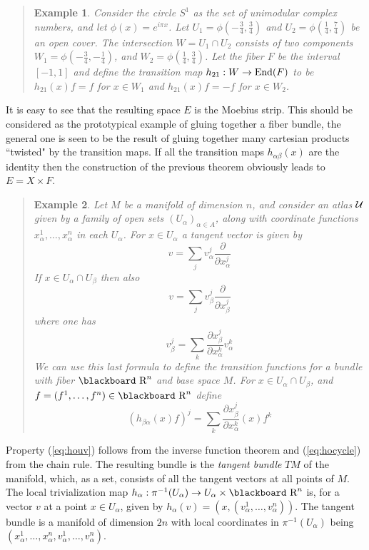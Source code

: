 \documentclass[12pt,titlepage]{article}
\def\bbf#1{\hbox{\blackboard #1}}
\def\lR{\bbf R}
\def\cU{{\cal U}}
\def\End{\hbox{End}}
\def\ppv#1#2{\frac{\partial}{\partial #1^#2}}
\newtheorem{eg}{Example}
\newenvironment{example}{\begin{quote}\begin{eg}}{\end{eg}\end{quote}}
\begin{document}
\begin{example}\label{ex:moebius}
Consider the circle \(S^1\) as the set of unimodular complex numbers,
and let \(\phi(x)=e^{i\pi x}\).
Let \(U_1=\phi(-\frac{3}{4},\frac{3}{4})\) 
and \(U_2=\phi(\frac{1}{4},\frac{7}{4})\) be an
open cover. The intersection \(W=U_1\cap U_2\) consists of two components
\(W_1=\phi(-\frac{3}{4},-\frac{1}{4})\), and 
\(W_2=\phi(\frac{1}{4},\frac{3}{4})\). Let the fiber
\(F\) be the interval \([-1,1]\) and define the transition map
\(h_{21}:W\to \End(F)\) to be \(h_{21}(x)f=f\) for \(x \in W_1\) and
\(h_{21}(x)f=-f\) for \(x \in W_2\). 
\end{example}%
It is easy to see that the resulting space
\(E\) is the Moebius strip. This should be considered as the
prototypical example of gluing together 
a fiber bundle, the general one is seen to be
the result of gluing together many cartesian products ``twisted" by the
transition maps. If all the transition maps \(h_{\alpha\beta}(x)\) are
the identity then the construction of the previous theorem obviously
leads to \(E=X\times F\). 
\begin{example}\label{ex:tm}
Let \(M\) be a manifold of dimension \(n\),
and consider an atlas \(\cU\) given by a family
of open sets
\((U_\alpha)_{\alpha\in A}\), along with coordinate functions
\(x_\alpha^1,\dots,x_\alpha^n\) in each \(U_\alpha\). For \(x\in
U_\alpha\) a tangent vector is given by
\[
v=\sum_jv_\alpha^j\frac{\partial}{\partial x_\alpha^j}
\]
If \(x\in U_\alpha\cap U_\beta\) then also 
\[
v=\sum_jv_\beta^j\ppv{x_\beta}{j}
\]
where one has
\[
v_\beta^j = \sum_k \frac{\partial x_\beta^j}{\partial x_\alpha^k}
v_\alpha^k
\]
We can use this last formula to define the transition functions for a
bundle with fiber \(\lR^n\) and base space \(M\). For \(x\in
U_\alpha\cap U_\beta\), and \(f=(f^1,\dots,f^n)\in\lR^n\) define
\[
(h_{\beta\alpha}(x)f)^j=
\sum_k \frac{\partial x_\beta^j}{\partial x_\alpha^k}(x)f^k
\]
\end{example}%
Property (\ref{eq:houv}) follows from the 
inverse function  theorem and (\ref{eq:hocycle}) from the chain rule. 
The resulting bundle is the {\em tangent bundle\/}
%
\(TM\) of the manifold, which, as a set, consists of all the tangent vectors
at all points of \(M\).
The local trivialization map \(h_\alpha:\pi^{-1}(U_\alpha)\to
U_\alpha\times\lR^n\) is, for a vector \(v\) at a point \(x\in U_\alpha\),
given by \(h_\alpha(v) = (x,(v_\alpha^1, \dots, v_\alpha^n))\). The
tangent bundle is a manifold of dimension \(2n\) 
with local coordinates in \(\pi^{-
1}(U_\alpha)\) being \((x_\alpha^1,\dots,x_\alpha^n,v_\alpha^1, \dots,
v_\alpha^n)\). 
\end{document}
